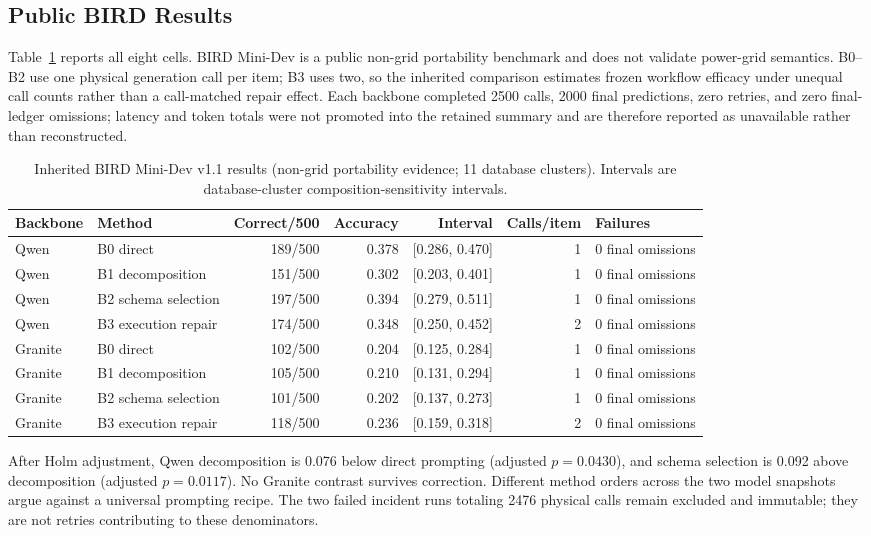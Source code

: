 \documentclass[applsci,article,submit,moreauthors]{Definitions/mdpi}
\begin{document}
\subsection{Public BIRD Results}

Table~\ref{tab:bird} reports all eight cells. BIRD Mini-Dev is a public non-grid portability benchmark and does not validate power-grid semantics. B0--B2 use one physical generation call per item; B3 uses two, so the inherited comparison estimates frozen workflow efficacy under unequal call counts rather than a call-matched repair effect. Each backbone completed 2500 calls, 2000 final predictions, zero retries, and zero final-ledger omissions; latency and token totals were not promoted into the retained summary and are therefore reported as unavailable rather than reconstructed.

\begin{table}[htbp]
\caption{Inherited BIRD Mini-Dev v1.1 results (non-grid portability evidence; 11 database clusters). Intervals are database-cluster composition-sensitivity intervals.}
\label{tab:bird}
\centering
\small
\setlength{\tabcolsep}{3pt}
\begin{tabular}{llrrrrp{1.5cm}}
\toprule
Backbone & Method & Correct/500 & Accuracy & Interval & Calls/item & Failures\\
\midrule
Qwen & B0 direct & 189/500 & 0.378 & [0.286, 0.470] & 1 & 0 final omissions\\
Qwen & B1 decomposition & 151/500 & 0.302 & [0.203, 0.401] & 1 & 0 final omissions\\
Qwen & B2 schema selection & 197/500 & 0.394 & [0.279, 0.511] & 1 & 0 final omissions\\
Qwen & B3 execution repair & 174/500 & 0.348 & [0.250, 0.452] & 2 & 0 final omissions\\
Granite & B0 direct & 102/500 & 0.204 & [0.125, 0.284] & 1 & 0 final omissions\\
Granite & B1 decomposition & 105/500 & 0.210 & [0.131, 0.294] & 1 & 0 final omissions\\
Granite & B2 schema selection & 101/500 & 0.202 & [0.137, 0.273] & 1 & 0 final omissions\\
Granite & B3 execution repair & 118/500 & 0.236 & [0.159, 0.318] & 2 & 0 final omissions\\
\bottomrule
\end{tabular}
\end{table}

After Holm adjustment, Qwen decomposition is 0.076 below direct prompting (adjusted $p=0.0430$), and schema selection is 0.092 above decomposition (adjusted $p=0.0117$). No Granite contrast survives correction. Different method orders across the two model snapshots argue against a universal prompting recipe. The two failed incident runs totaling 2476 physical calls remain excluded and immutable; they are not retries contributing to these denominators.
\end{document}
